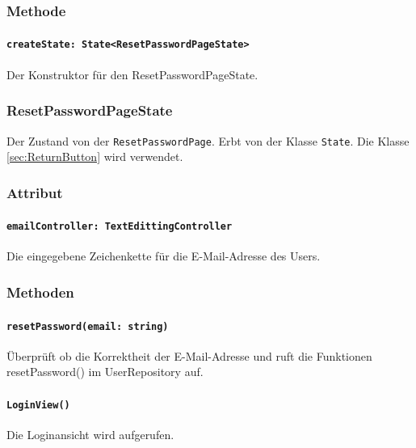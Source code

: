 \documentclass[parskip=full]{scrartcl}
\begin{document}
        \subsubsection*{Methode}
            \paragraph*{\texttt{createState: State<ResetPasswordPageState>}} Der Konstruktor für den ResetPasswordPageState.
    
    \subsubsection{ResetPasswordPageState}
        Der Zustand von der \texttt{ResetPasswordPage}. Erbt von der Klasse \texttt{State}. Die Klasse \ref{sec:ReturnButton} wird verwendet.
        \subsubsection*{Attribut}
            \paragraph*{\texttt{emailController: TextEdittingController}} Die eingegebene Zeichenkette für die E-Mail-Adresse des Users.
    
        \subsubsection*{Methoden}
            \paragraph*{\texttt{resetPassword(email: string)}} Überprüft ob die Korrektheit der E-Mail-Adresse und ruft die Funktionen resetPassword() im UserRepository auf.
            \paragraph*{\texttt{LoginView()}} Die Loginansicht wird aufgerufen.
    
\end{document}
